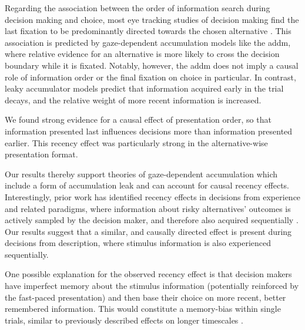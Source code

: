 \documentclass[11pt, a4paper, twocolumn, abstract]{scrartcl}
\begin{document}
Regarding the association between the order of information search during decision making and choice, most eye tracking studies of decision making find the last fixation to be predominantly directed towards the chosen alternative \parencite{krajbich2010VisualFixationsComputation,krajbich2011MultialternativeDriftdiffusionModel,glickman2019FormationPreferenceRisky,stewart2016EyeMovementsRisky,fiedler2012DynamicsDecisionMaking}. This association is predicted by gaze-dependent accumulation models like the \gls{addm}, where relative evidence for an alternative is more likely to cross the decision boundary while it is fixated. Notably, however, the \gls{addm} does not imply a causal role of information order or the final fixation on choice in particular. In contrast, leaky accumulator models \parencite[e.g.,][]{glickman2019FormationPreferenceRisky,molter2021GazedependentEvidenceAccumulation,ashby2016FindingRightFit,usher2001TimeCoursePerceptual} predict that information acquired early in the trial decays, and the relative weight of more recent information is increased.

We found strong evidence for a causal effect of presentation order, so that information presented last influences decisions more than information presented earlier. This recency effect was particularly strong in the alternative-wise presentation format.

Our results thereby support theories of gaze-dependent accumulation which include a form of accumulation leak and can account for causal recency effects. Interestingly, prior work has identified recency effects in decisions from experience and related paradigms, where information about risky alternatives' outcomes is actively sampled by the decision maker, and therefore also acquired sequentially \parencite{hertwig2004DecisionsExperienceEffect,tsetsos2012SalienceDrivenValue}. Our results suggest that a similar, and causally directed effect is present during decisions from description, where stimulus information is also experienced sequentially.

One possible explanation for the observed recency effect is that decision makers have imperfect memory about the stimulus information (potentially reinforced by the fast-paced presentation) and then base their choice on more recent, better remembered information. This would constitute a memory-bias within single trials, similar to previously described effects on longer timescales \parencite{gluth2015EffectiveConnectivityHippocampus,weilbacher2021InfluenceVisualAttention}.
\end{document}
